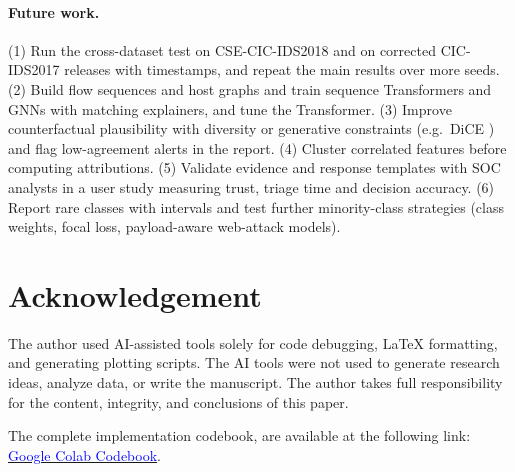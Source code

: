 \documentclass[11pt,a4paper]{article}
\begin{document}
\paragraph{Future work.} (1) Run the cross-dataset test on CSE-CIC-IDS2018 and on corrected CIC-IDS2017 releases with timestamps, and repeat the main results over more seeds. (2) Build flow sequences and host graphs and train sequence Transformers and GNNs with matching explainers, and tune the Transformer. (3) Improve counterfactual plausibility with diversity or generative constraints (e.g.\ DiCE \parencite{mothilal2020}) and flag low-agreement alerts in the report. (4) Cluster correlated features before computing attributions. (5) Validate evidence and response templates with SOC analysts in a user study measuring trust, triage time and decision accuracy. (6) Report rare classes with intervals and test further minority-class strategies (class weights, focal loss, payload-aware web-attack models).
\section*{Acknowledgement}
The author used AI-assisted tools solely for code debugging, \LaTeX{} formatting, and generating plotting scripts. The AI tools were not used to generate research ideas, analyze data, or write the manuscript. The author takes full responsibility for the content, integrity, and conclusions of this paper.

The complete implementation codebook, are available at the following link: \href{https://colab.research.google.com/drive/1B6JOY7R4DQaQiLw5LP3TIb7GvRaZ21YO#scrollTo=1428241e}{\textcolor{blue}{Google Colab Codebook}}.


\printbibliography
\end{document}
